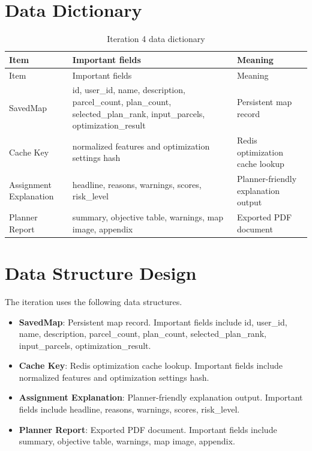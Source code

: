 \documentclass[12pt,a4paper,oneside]{report}
\begin{document}
\section{Data Dictionary}

\begin{longtable}{p{}p{}p{}}
\caption{Iteration 4 data dictionary}\label{tab:iter9dict}\\
\toprule
Item & Important fields & Meaning \\
\midrule
\endfirsthead
\toprule
Item & Important fields & Meaning \\
\midrule
\endhead

SavedMap & id, user\_id, name, description, parcel\_count, plan\_count, selected\_plan\_rank, input\_parcels, optimization\_result & Persistent map record \\

Cache Key & normalized features and optimization settings hash & Redis optimization cache lookup \\

Assignment Explanation & headline, reasons, warnings, scores, risk\_level & Planner-friendly explanation output \\

Planner Report & summary, objective table, warnings, map image, appendix & Exported PDF document \\

\bottomrule
\end{longtable}

\section{Data Structure Design}
The iteration uses the following data structures.
\begin{itemize}

\item \textbf{SavedMap}: Persistent map record. Important fields include id, user\_id, name, description, parcel\_count, plan\_count, selected\_plan\_rank, input\_parcels, optimization\_result.

\item \textbf{Cache Key}: Redis optimization cache lookup. Important fields include normalized features and optimization settings hash.

\item \textbf{Assignment Explanation}: Planner-friendly explanation output. Important fields include headline, reasons, warnings, scores, risk\_level.

\item \textbf{Planner Report}: Exported PDF document. Important fields include summary, objective table, warnings, map image, appendix.

\end{itemize}
\end{document}
